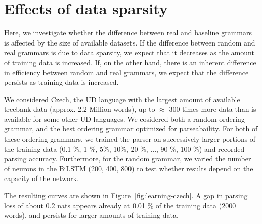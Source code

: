 \documentclass[10pt,twoside,lineno]{article}
\begin{document}
\section{Effects of data sparsity}

Here, we investigate whether the difference between real and baseline grammars is affected by the size of available datasets.
If the difference between random and real grammars is due to data sparsity, we expect that it decreases as the amount of training data is increased.
If, on the other hand, there is an inherent difference in efficiency between random and real grammars, we expect that the difference persists as training data is increased.

We considered Czech, the UD language with the largest amount of available treebank data (approx. 2.2 Million words), up to $\approx$ 300 times more data than is available for some other UD languages.
We cosidered both a random ordering grammar, and the best ordering grammar optimized for parseabaility.
For both of these ordering grammars, we trained the parser on successively larger portions of the training data (0.1 \%, 1 \%, 5\%, 10\%, 20 \%, ..., 90 \%, 100 \%) and recorded parsing accuracy.
Furthermore, for the random grammar, we varied the number of neurons in the BiLSTM (200, 400, 800) to test whether results depend on the capacity of the network.


The resulting curves are shown in Figure~\ref{fig:learning-czech}.
A gap in parsing loss of about 0.2 nats appears already at 0.01 \% of the training data (2000 words), and persists for larger amounts of training data.
\end{document}
